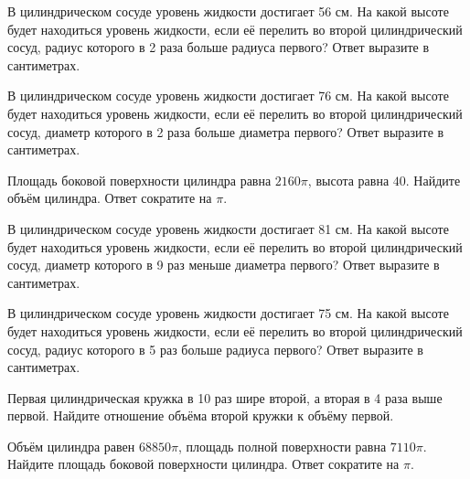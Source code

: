 \documentclass[4apaper]{article}
\begin{document}
\begin{taskBN}{15}
В цилиндрическом сосуде уровень жидкости достигает 56 см. На какой высоте будет находиться уровень жидкости, если её перелить во второй цилиндрический сосуд, радиус которого в 2 раза больше радиуса первого? Ответ выразите в сантиметрах.
\end{taskBN}

\begin{taskBN}{16}
В цилиндрическом сосуде уровень жидкости достигает 76 см. На какой высоте будет находиться уровень жидкости, если её перелить во второй цилиндрический сосуд, диаметр которого в 2 раза больше диаметра первого? Ответ выразите в сантиметрах.
\end{taskBN}

\begin{taskBN}{17}
Площадь боковой поверхности цилиндра равна $2160\pi$, высота равна $40$. Найдите объём цилиндра. Ответ сократите на $\pi$.
\end{taskBN}

\begin{taskBN}{18}
В цилиндрическом сосуде уровень жидкости достигает 81 см. На какой высоте будет находиться уровень жидкости, если её перелить во второй цилиндрический сосуд, диаметр которого в 9 раз меньше диаметра первого? Ответ выразите в сантиметрах.
\end{taskBN}

\begin{taskBN}{19}
В цилиндрическом сосуде уровень жидкости достигает 75 см. На какой высоте будет находиться уровень жидкости, если её перелить во второй цилиндрический сосуд, радиус которого в 5 раз больше радиуса первого? Ответ выразите в сантиметрах.
\end{taskBN}

\begin{taskBN}{20}
 Первая цилиндрическая кружка в 10 раз шире второй, а вторая в 4 раза выше первой. Найдите отношение объёма второй кружки к объёму первой.
\end{taskBN}

\begin{taskBN}{21}
Объём цилиндра равен $68850\pi$, площадь полной поверхности равна $7110\pi$. Найдите площадь боковой поверхности цилиндра. Ответ сократите на $\pi$.
\end{taskBN}
\end{document}
